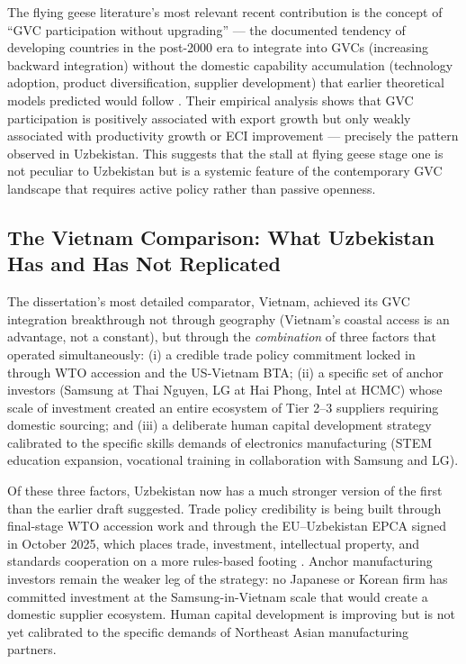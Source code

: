 The flying geese literature's most relevant recent contribution is the concept of ``GVC participation without upgrading'' --- the documented tendency of developing countries in the post-2000 era to integrate into GVCs (increasing backward integration) without the domestic capability accumulation (technology adoption, product diversification, supplier development) that earlier theoretical models predicted would follow \citep{milberg2013}. Their empirical analysis shows that GVC participation is positively associated with export growth but only weakly associated with productivity growth or ECI improvement --- precisely the pattern observed in Uzbekistan. This suggests that the stall at flying geese stage one is not peculiar to Uzbekistan but is a systemic feature of the contemporary GVC landscape that requires active policy rather than passive openness.

\subsection{The Vietnam Comparison: What Uzbekistan Has and Has Not Replicated}

The dissertation's most detailed comparator, Vietnam, achieved its GVC integration breakthrough not through geography (Vietnam's coastal access is an advantage, not a constant), but through the \textit{combination} of three factors that operated simultaneously: (i) a credible trade policy commitment locked in through WTO accession and the US-Vietnam BTA; (ii) a specific set of anchor investors (Samsung at Thai Nguyen, LG at Hai Phong, Intel at HCMC) whose scale of investment created an entire ecosystem of Tier 2--3 suppliers requiring domestic sourcing; and (iii) a deliberate human capital development strategy calibrated to the specific skills demands of electronics manufacturing (STEM education expansion, vocational training in collaboration with Samsung and LG).

Of these three factors, Uzbekistan now has a much stronger version of the first than the earlier draft suggested. Trade policy credibility is being built through final-stage WTO accession work and through the EU--Uzbekistan EPCA signed in October 2025, which places trade, investment, intellectual property, and standards cooperation on a more rules-based footing \citep{wto2025uzbekistan, uzbekistan2025epca}. Anchor manufacturing investors remain the weaker leg of the strategy: no Japanese or Korean firm has committed investment at the Samsung-in-Vietnam scale that would create a domestic supplier ecosystem. Human capital development is improving but is not yet calibrated to the specific demands of Northeast Asian manufacturing partners.

